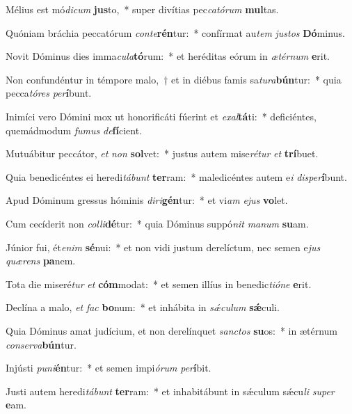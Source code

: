 \item Mélius est mó\textit{di}\textit{cum} \textbf{jus}to,~* super divítias pec\textit{ca}\textit{tó}\textit{rum} \textbf{mul}tas.
\item Quóniam bráchia peccatórum \textit{con}\textit{te}\textbf{rén}tur:~* confírmat au\textit{tem} \textit{jus}\textit{tos} \textbf{Dó}minus.
\item Novit Dóminus dies imma\textit{cu}\textit{la}\textbf{tó}rum:~* et heréditas eórum in \textit{æ}\textit{tér}\textit{num} \textbf{e}rit.
\item Non confundéntur in témpore malo,~† et in diébus famis sa\textit{tu}\textit{ra}\textbf{bún}tur:~* quia pecca\textit{tó}\textit{res} \textit{per}\textbf{í}bunt.
\item Inimíci vero Dómini mox ut honorificáti fúerint et \textit{ex}\textit{al}\textbf{tá}ti:~* deficiéntes, quemádmodum \textit{fu}\textit{mus} \textit{de}\textbf{fí}cient.
\item Mutuábitur peccátor, \textit{et} \textit{non} \textbf{sol}vet:~* justus autem mise\textit{ré}\textit{tur} \textit{et} \textbf{trí}buet.
\item Quia benedicéntes ei heredi\textit{tá}\textit{bunt} \textbf{ter}ram:~* maledicéntes autem e\textit{i} \textit{dis}\textit{per}\textbf{í}bunt.
\item Apud Dóminum gressus hóminis \textit{di}\textit{ri}\textbf{gén}tur:~* et vi\textit{am} \textit{e}\textit{jus} \textbf{vo}let.
\item Cum cecíderit non \textit{col}\textit{li}\textbf{dé}tur:~* quia Dóminus suppó\textit{nit} \textit{ma}\textit{num} \textbf{su}am.
\item Júnior fui, ét\textit{e}\textit{nim} \textbf{sé}nui:~* et non vidi justum derelíctum, nec semen e\textit{jus} \textit{quæ}\textit{rens} \textbf{pa}nem.
\item Tota die miseré\textit{tur} \textit{et} \textbf{cóm}modat:~* et semen illíus in benedic\textit{ti}\textit{ó}\textit{ne} \textbf{e}rit.
\item Declína a malo, \textit{et} \textit{fac} \textbf{bo}num:~* et inhábita in \textit{sǽ}\textit{cu}\textit{lum} \textbf{sǽ}culi.
\item Quia Dóminus amat judícium, et non derelínquet \textit{sanc}\textit{tos} \textbf{su}os:~* in ætérnum \textit{con}\textit{ser}\textit{va}\textbf{bún}tur.
\item Injústi \textit{pu}\textit{ni}\textbf{én}tur:~* et semen impi\textit{ó}\textit{rum} \textit{per}\textbf{í}bit.
\item Justi autem heredi\textit{tá}\textit{bunt} \textbf{ter}ram:~* et inhabitábunt in sǽculum sǽcu\textit{li} \textit{su}\textit{per} \textbf{e}am.

